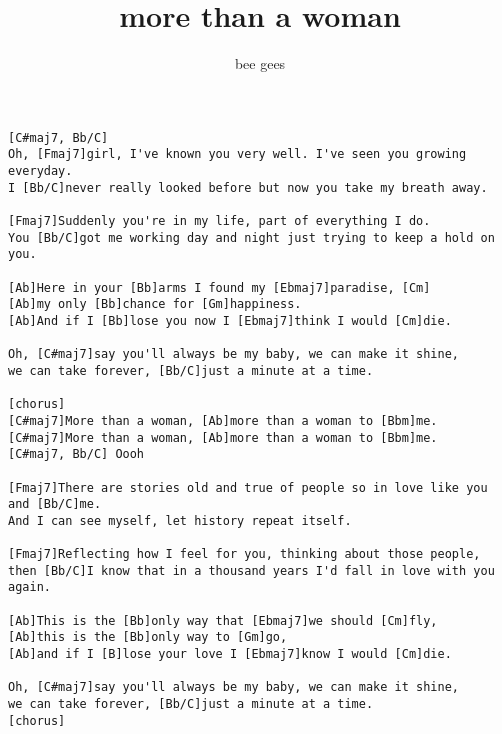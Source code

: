 \author{bee gees}
\title{more than a woman}
\maketitle
\begin{verbatim}
[C#maj7, Bb/C]
Oh, [Fmaj7]girl, I've known you very well. I've seen you growing everyday. 
I [Bb/C]never really looked before but now you take my breath away. 

[Fmaj7]Suddenly you're in my life, part of everything I do. 
You [Bb/C]got me working day and night just trying to keep a hold on you. 

[Ab]Here in your [Bb]arms I found my [Ebmaj7]paradise, [Cm]
[Ab]my only [Bb]chance for [Gm]happiness. 
[Ab]And if I [Bb]lose you now I [Ebmaj7]think I would [Cm]die. 

Oh, [C#maj7]say you'll always be my baby, we can make it shine, 
we can take forever, [Bb/C]just a minute at a time. 

[chorus]
[C#maj7]More than a woman, [Ab]more than a woman to [Bbm]me. 
[C#maj7]More than a woman, [Ab]more than a woman to [Bbm]me. 
[C#maj7, Bb/C] Oooh 

[Fmaj7]There are stories old and true of people so in love like you and [Bb/C]me. 
And I can see myself, let history repeat itself. 
    
[Fmaj7]Reflecting how I feel for you, thinking about those people,
then [Bb/C]I know that in a thousand years I'd fall in love with you again. 

[Ab]This is the [Bb]only way that [Ebmaj7]we should [Cm]fly, 
[Ab]this is the [Bb]only way to [Gm]go,
[Ab]and if I [B]lose your love I [Ebmaj7]know I would [Cm]die. 

Oh, [C#maj7]say you'll always be my baby, we can make it shine, 
we can take forever, [Bb/C]just a minute at a time. 
[chorus]
\end{verbatim}